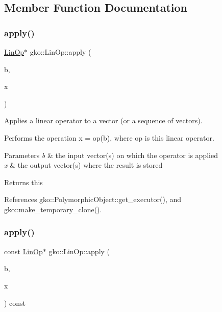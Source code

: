 \subsection{Member Function Documentation}
\mbox{\label{classgko_1_1LinOp_a0449b2fc705d2f970855af23b5e2788e}} 
\subsubsection{\texorpdfstring{apply()}{apply()}\hspace{0.1cm}{\footnotesize\ttfamily [1/4]}}
{\footnotesize\ttfamily \hyperlink{classgko_1_1LinOp}{Lin\+Op}$\ast$ gko\+::\+Lin\+Op\+::apply (\begin{DoxyParamCaption}\item[{const \hyperlink{classgko_1_1LinOp}{Lin\+Op} $\ast$}]{b,  }\item[{\hyperlink{classgko_1_1LinOp}{Lin\+Op} $\ast$}]{x }\end{DoxyParamCaption})\hspace{0.3cm}{\ttfamily [inline]}}



Applies a linear operator to a vector (or a sequence of vectors). 

Performs the operation x = op(b), where op is this linear operator.


\begin{DoxyParams}{Parameters}
{\em b} & the input vector(s) on which the operator is applied \\
\hline
{\em x} & the output vector(s) where the result is stored\\
\hline
\end{DoxyParams}
\begin{DoxyReturn}{Returns}
this 
\end{DoxyReturn}


References gko\+::\+Polymorphic\+Object\+::get\+\_\+executor(), and gko\+::make\+\_\+temporary\+\_\+clone().

\mbox{\label{classgko_1_1LinOp_a74afc0e94716dbf4f3e1d7182e37456f}} 
\subsubsection{\texorpdfstring{apply()}{apply()}\hspace{0.1cm}{\footnotesize\ttfamily [2/4]}}
{\footnotesize\ttfamily const \hyperlink{classgko_1_1LinOp}{Lin\+Op}$\ast$ gko\+::\+Lin\+Op\+::apply (\begin{DoxyParamCaption}\item[{const \hyperlink{classgko_1_1LinOp}{Lin\+Op} $\ast$}]{b,  }\item[{\hyperlink{classgko_1_1LinOp}{Lin\+Op} $\ast$}]{x }\end{DoxyParamCaption}) const\hspace{0.3cm}{\ttfamily [inline]}}



